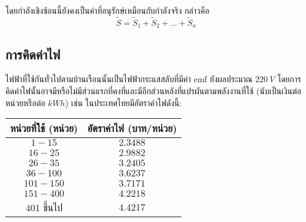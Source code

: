โดยกำลังเชิงซ้อนนี้ยังคงเป็นค่าที่อนุรักษ์เหมือนกับกำลังจริง กล่าวคือ
\begin{equation}
    \tilde{S} = \tilde{S}_1 + \tilde{S}_2 + \dots + \tilde{S}_n
\end{equation}

\subsection{การคิดค่าไฟ}

ไฟฟ้าที่ใช้กันทั่วไปตามบ้านเรือนนั้นเป็นไฟฟ้ากระแสสลับที่มีค่า emf ยังผลประมาณ $\qty{220}{V}$ โดยการคิดค่าไฟนั้นอาจมีหรือไม่มีส่วนแรกที่คงที่และมีอีกส่วนหลังที่แปรผันตามพลังงานที่ใช้ (นับเป็นเงินต่อหน่วยหรือต่อ $\unit{kWh}$) เช่น ในประเทศไทยมีอัตราค่าไฟดังนี้:
\begin{table}[h]
    \centering
    \begin{tabular}{|c|c|}
        \hline
        \bfseries{หน่วยที่ใช้ (หน่วย)} & \bfseries{อัตราค่าไฟ (บาท/หน่วย)} \\
        \hline
        $1-15$ & $2.3488$ \\
        $16-25$ & $2.9882$ \\
        $26-35$ & $3.2405$ \\
        $36-100$ & $3.6237$ \\
        $101-150$ & $3.7171$ \\
        $151-400$ & $4.2218$ \\
        $401$ ขึ้นไป & $4.4217$ \\
        \hline
    \end{tabular}
\end{table}


